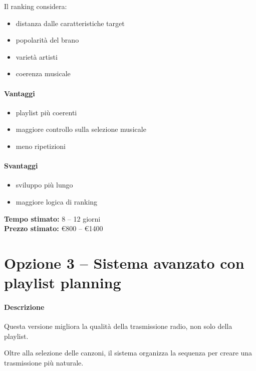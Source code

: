 \documentclass[11pt,a4paper]{article}
\begin{document}
Il ranking considera:
\begin{itemize}
    \item distanza dalle caratteristiche target
    \item popolarità del brano
    \item varietà artisti
    \item coerenza musicale
\end{itemize}

\paragraph{Vantaggi}
\begin{itemize}
    \item playlist più coerenti
    \item maggiore controllo sulla selezione musicale
    \item meno ripetizioni
\end{itemize}

\paragraph{Svantaggi}
\begin{itemize}
    \item sviluppo più lungo
    \item maggiore logica di ranking
\end{itemize}

\vspace{0.3cm}
\noindent \textbf{Tempo stimato:} 8 -- 12 giorni \\[0.2cm]
\noindent \textbf{Prezzo stimato:} €800 -- €1400

\vspace{0.5cm}
\hrulefill
\vspace{0.5cm}

\section{Opzione 3 -- Sistema avanzato con playlist planning}

\paragraph{Descrizione}
Questa versione migliora la qualità della trasmissione radio, non solo della playlist.

Oltre alla selezione delle canzoni, il sistema organizza la sequenza per creare una trasmissione più naturale.
\end{document}
